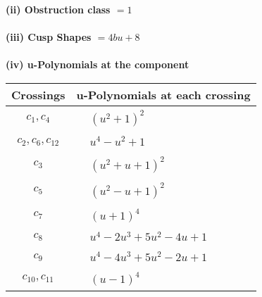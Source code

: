 \documentclass[1p]{elsarticle_modified}
\theoremstyle{definition}
\begin{document}
\flushleft \textbf{(ii) Obstruction class $= 1$}\\~\\
\flushleft \textbf{(iii) Cusp Shapes $= 4 b u+8$}\\~\\
\newpage\renewcommand{\arraystretch}{1}
\flushleft \textbf{(iv) u-Polynomials at the component}\newline \\
\begin{tabular}{m{50pt}|m{274pt}}
Crossings & \hspace{64pt}u-Polynomials at each crossing \\
\hline $$\begin{aligned}c_{1},c_{4}\end{aligned}$$&$\begin{aligned}
&(u^2+1)^2
\end{aligned}$\\
\hline $$\begin{aligned}c_{2},c_{6},c_{12}\end{aligned}$$&$\begin{aligned}
&u^4- u^2+1
\end{aligned}$\\
\hline $$\begin{aligned}c_{3}\end{aligned}$$&$\begin{aligned}
&(u^2+u+1)^2
\end{aligned}$\\
\hline $$\begin{aligned}c_{5}\end{aligned}$$&$\begin{aligned}
&(u^2- u+1)^2
\end{aligned}$\\
\hline $$\begin{aligned}c_{7}\end{aligned}$$&$\begin{aligned}
&(u+1)^4
\end{aligned}$\\
\hline $$\begin{aligned}c_{8}\end{aligned}$$&$\begin{aligned}
&u^4-2 u^3+5 u^2-4 u+1
\end{aligned}$\\
\hline $$\begin{aligned}c_{9}\end{aligned}$$&$\begin{aligned}
&u^4-4 u^3+5 u^2-2 u+1
\end{aligned}$\\
\hline $$\begin{aligned}c_{10},c_{11}\end{aligned}$$&$\begin{aligned}
&(u-1)^4
\end{aligned}$\\
\hline
\end{tabular}\\~\\
\end{document}
